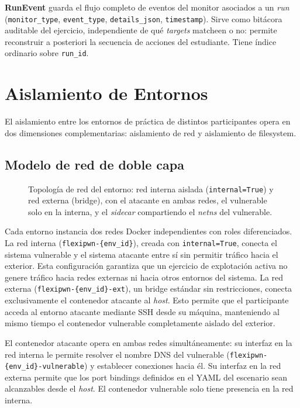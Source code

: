 \begin{sloppypar}
\textbf{RunEvent} guarda el flujo completo de eventos del monitor asociados a un
\textit{run} (\texttt{monitor\_type}, \texttt{event\_type},
\texttt{details\_json}, \texttt{timestamp}). Sirve como bitácora auditable del
ejercicio, independiente de qué \textit{targets} matcheen o no: permite
reconstruir a posteriori la secuencia de
acciones del estudiante. Tiene índice ordinario sobre \texttt{run\_id}.
\end{sloppypar}

\section{Aislamiento de Entornos}

El aislamiento entre los entornos de práctica de distintos participantes opera
en dos dimensiones complementarias: aislamiento de red y aislamiento de
filesystem.

\subsection*{Modelo de red de doble capa}

\begin{figure}[h]
    \centering
    \resizebox{0.7\textwidth}{!}{}
    \caption[Topología de red del entorno]{Topología de red del entorno: red interna aislada
    (\texttt{internal=True}) y red externa (bridge), con el atacante en ambas
    redes, el vulnerable solo en la interna, y el \textit{sidecar} compartiendo
    el \textit{netns} del vulnerable.}
    \label{fig:topologia-red}
\end{figure}

Cada entorno instancia dos redes Docker independientes con roles diferenciados.
La red interna (\texttt{flexipwn-\{env\_id\}}), creada con
\texttt{internal=True}, conecta el sistema vulnerable y el sistema atacante
entre sí sin permitir tráfico hacia el exterior. Esta configuración garantiza
que un ejercicio de explotación activa no genere tráfico hacia redes externas ni
hacia otros entornos del sistema. La red externa
(\texttt{flexipwn-\{env\_id\}-ext}), un bridge estándar sin restricciones,
conecta exclusivamente el contenedor atacante al \textit{host}. Esto permite que
el participante acceda al entorno atacante mediante SSH desde su máquina,
manteniendo al mismo tiempo el contenedor vulnerable completamente aislado del
exterior.

El contenedor atacante opera en ambas redes simultáneamente: su interfaz en la
red interna le permite resolver el nombre DNS del vulnerable
(\texttt{flexipwn-\{env\_id\}-vulnerable}) y establecer conexiones hacia él. Su
interfaz en la red externa permite que los port bindings definidos en el YAML
del escenario sean alcanzables desde el \textit{host}. El contenedor vulnerable
solo tiene presencia en la red interna.

